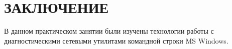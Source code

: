 \section*{ЗАКЛЮЧЕНИЕ}

В данном практическом занятии были изучены технологии работы с
диагностическими сетевыми утилитами командной строки MS Windows.

\newpage
